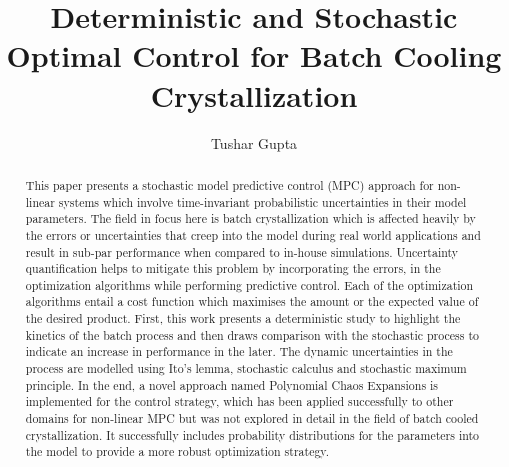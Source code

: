 \documentclass[3p,times,authoryear]{elsarticle}
\begin{document}
\begin{frontmatter}



\dochead{}

\title{Deterministic and Stochastic Optimal Control for Batch Cooling Crystallization}


\author{Tushar Gupta}

\address{}

\begin{abstract}

This paper presents a stochastic model predictive control (MPC) approach for non-linear systems which involve time-invariant probabilistic uncertainties in their model parameters. The field in focus here is batch crystallization which is affected heavily by the errors or uncertainties that creep into the model during real world applications and result in sub-par performance when compared to in-house simulations. Uncertainty quantification helps to mitigate this problem by incorporating the errors, in the optimization algorithms while performing predictive control. Each of the optimization algorithms entail a cost function which maximises the amount or the expected value of the desired product. First, this work presents a deterministic study to highlight the kinetics of the batch process and then draws comparison with the stochastic process to indicate an increase in performance in the later. The dynamic uncertainties in the process are modelled using Ito's lemma, stochastic calculus and stochastic maximum principle. In the end, a novel approach named Polynomial Chaos Expansions is implemented for the control strategy, which has been applied successfully to other domains for non-linear MPC but was not explored in detail in the field of batch cooled crystallization. It successfully includes probability distributions for the parameters into the model to provide a more robust optimization strategy.


\end{abstract}
\end{frontmatter}
\end{document}
